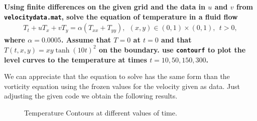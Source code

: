 \textbf{ Using finite differences on the given grid and the data in $u$ and $v$ from \texttt{velocitydata.mat}, solve the equation of temperature in a fluid flow}
\begin{align*}
T_t + uT_x + vT_y = \alpha(T_{xx}+T_{yy}),~~(x,y)\in (0,1) \times (0,1),~~t>0,
\end{align*} 
\textbf{where $\alpha = 0.0005$. Assume that $T=0$ at $t=0$ and that $T(t,x,y) = xy\tanh(10t)^2$ on the boundary. use \texttt{contourf} to plot the level curves to the temperature at times $t = 10,50,150,300$.}

We can appreciate that the equation to solve has the same form than the vorticity equation using the frozen values for the velocity given as data. Just adjusting the given code we obtain the following results.

\begin{figure}[H]
\centering     %
\hspace*{\fill}
\hfill
{}
\hspace*{\fill}

\hspace*{\fill}
\hfill
{}
\hspace*{\fill}
\caption{Temperature Contours at different values of time.}
\end{figure}

